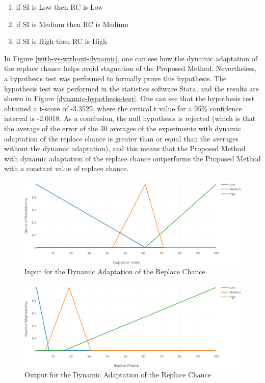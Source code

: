 \documentclass[12pt,journal,draftcls,onecolumn]{IEEEtran}
\begin{document}
\begin{enumerate}
\item if SI is Low then RC is Low
\item if SI is Medium then RC is Medium
\item if SI is High then RC is High
\end{enumerate}

In Figure \ref{with-vs-without-dynamic}, one can see how the dynamic
adaptation of the replace chance helps avoid stagnation of the
Proposed Method. Nevertheless, a hypothesis test was performed to
formally prove this hypothesis. The hypothesis test was performed in
the statistics software Stata, and the results are shown in Figure
\ref{dynamic-hypothesis-test}. One can see that the hypothesis test
obtained a t-score of -3.3529, where the critical t value for a 95\%
confidence interval is -2.0018. As a conclusion, the null hypothesis
is rejected (which is that the average of the error of the 30 averages
of the experiments with dynamic adaptation of the replace chance is
greater than or equal than the averages without the dynamic
adaptation), and this means that the Proposed Method with dynamic
adaptation of the replace chance outperforms the Proposed Method with
a constant value of replace chance.

\begin{figure}[h!]
\caption{Input for the Dynamic Adaptation of the Replace Chance}
\label{dynamic-adaptation-input}
\begin{center}
\includegraphics[width=0.7\columnwidth]{figures/stagnation-input/stagnation-input.png}
\end{center}
\end{figure}

\begin{figure}[h!]
\caption{Output for the Dynamic Adaptation of the Replace Chance}
\label{dynamic-adaptation-output}
\begin{center}
\includegraphics[width=0.7\columnwidth]{figures/stagnation-output/stagnation-output.png}
\end{center}
\end{figure}
\end{document}
